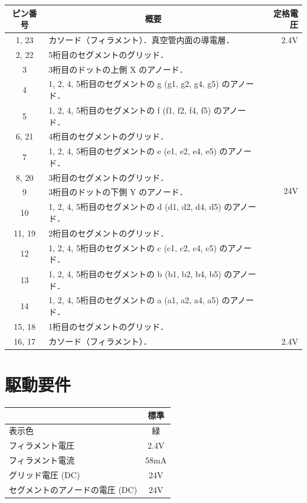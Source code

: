 \documentclass[12pt]{jarticle}
\begin{document}
\begin{table}[h]
    \centering
    \begin{tabular}{|c|l||r|} \hline
        ピン番号 & \multicolumn{1}{c||}{概要} & 定格電圧 \\ \hline \hline
        1, 23 & カソード（フィラメント）．真空管内面の導電層． & 2.4V \\ \hline
        2, 22 & 5桁目のセグメントのグリッド． & \multirow{14}{*}{24V} \\ \cline{1-2}
        3 & 3桁目のドットの上側 X のアノード． & \\ \cline{1-2}
        4 & 1, 2, 4, 5桁目のセグメントの g (g1, g2, g4, g5) のアノード． & \\ \cline{1-2}
        5 & 1, 2, 4, 5桁目のセグメントの f (f1, f2, f4, f5) のアノード． & \\ \cline{1-2}
        6, 21 & 4桁目のセグメントのグリッド． & \\ \cline{1-2}
        7 & 1, 2, 4, 5桁目のセグメントの e (e1, e2, e4, e5) のアノード． & \\ \cline{1-2}
        8, 20 & 3桁目のセグメントのグリッド． & \\ \cline{1-2}
        9 & 3桁目のドットの下側 Y のアノード． & \\ \cline{1-2}
        10 & 1, 2, 4, 5桁目のセグメントの d (d1, d2, d4, d5) のアノード． & \\ \cline{1-2}
        11, 19 & 2桁目のセグメントのグリッド． & \\ \cline{1-2}
        12 & 1, 2, 4, 5桁目のセグメントの c (c1, c2, c4, c5) のアノード． & \\ \cline{1-2}
        13 & 1, 2, 4, 5桁目のセグメントの b (b1, b2, b4, b5) のアノード． & \\ \cline{1-2}
        14 & 1, 2, 4, 5桁目のセグメントの a (a1, a2, a4, a5) のアノード． & \\ \cline{1-2}
        15, 18 & 1桁目のセグメントのグリッド． & \\ \hline
        16, 17 & カソード（フィラメント）． & 2.4V \\ \hline
    \end{tabular}
\end{table}

\clearpage

\section{駆動要件}

\begin{table}[h]
    \centering
    \begin{tabular}{|l|c|} \hline
        & 標準 \\ \hline \hline
        表示色 & 緑 \\ \hline
        フィラメント電圧 & 2.4V \\ \hline
        フィラメント電流 & 58mA \\ \hline
        グリッド電圧 (DC) & 24V \\ \hline
        セグメントのアノードの電圧 (DC) & 24V \\ \hline
    \end{tabular}
\end{table}
\end{document}
